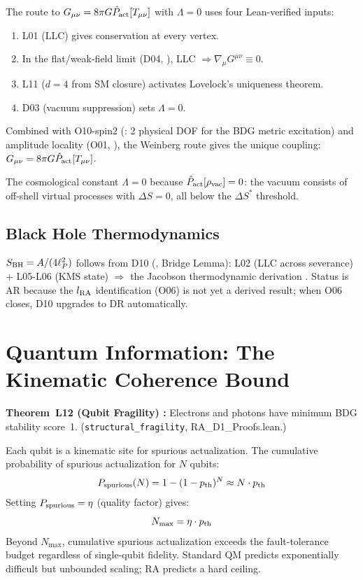 \documentclass[12pt,a4paper]{article}
\begin{document}
The route to $G_{\mu\nu}=8\pi G\hat{P}_{\mathrm{act}}[T_{\mu\nu}]$ with $\Lambda=0$ uses four Lean-verified inputs:
\begin{enumerate}
  \item L01 (LLC) gives conservation at every vertex.
  \item In the flat/weak-field limit (D04, \statusDR), LLC $\Rightarrow \nabla_\mu G^{\mu\nu}\equiv0$.
  \item L11 ($d=4$ from SM closure) activates Lovelock's uniqueness theorem.
  \item D03 (vacuum suppression) sets $\Lambda=0$.
\end{enumerate}
Combined with O10-spin2 (\statusLV: 2 physical DOF for the BDG metric excitation) and amplitude locality (O01, \statusLV), the Weinberg route \cite{Weinberg1964} gives the unique coupling: $G_{\mu\nu}=8\pi G\hat{P}_{\mathrm{act}}[T_{\mu\nu}]$.

The cosmological constant $\Lambda=0$ because $\hat{P}_{\mathrm{act}}[\rho_{\rm vac}]=0$: the vacuum consists of off-shell virtual processes with $\Delta S=0$, all below the $\Delta S^*$ threshold.

\subsection{Black Hole Thermodynamics}

$S_{\rm BH}=A/(4\ell_P^2)$ follows from D10 (\statusAR, Bridge Lemma): L02 (LLC across severance) + L05-L06 (KMS state) $\Rightarrow$ the Jacobson thermodynamic derivation \cite{Jacobson1995}.  Status is AR because the $l_{\rm RA}$ identification (O06) is not yet a derived result; when O06 closes, D10 upgrades to DR automatically.

\section{Quantum Information: The Kinematic Coherence Bound}\label{sec:kcb}

\begin{leanbox}
\textbf{Theorem~L12 (Qubit Fragility) \statusLV:} Electrons and photons have minimum BDG stability score~1.  (\texttt{structural\_fragility}, RA\_D1\_Proofs.lean.)
\end{leanbox}

Each qubit is a kinematic site for spurious actualization.  The cumulative probability of spurious actualization for $N$ qubits:
\begin{equation}
  P_{\rm spurious}(N) = 1-(1-p_{\rm th})^N \approx N\cdot p_{\rm th}
\end{equation}
Setting $P_{\rm spurious}=\eta$ (quality factor) gives:
\begin{equation}
  N_{\max} = \eta\cdot p_{\rm th}
  \label{eq:KCB}
\end{equation}
Beyond $N_{\max}$, cumulative spurious actualization exceeds the fault-tolerance budget regardless of single-qubit fidelity.  Standard QM predicts exponentially difficult but unbounded scaling; RA predicts a hard ceiling.
\end{document}
